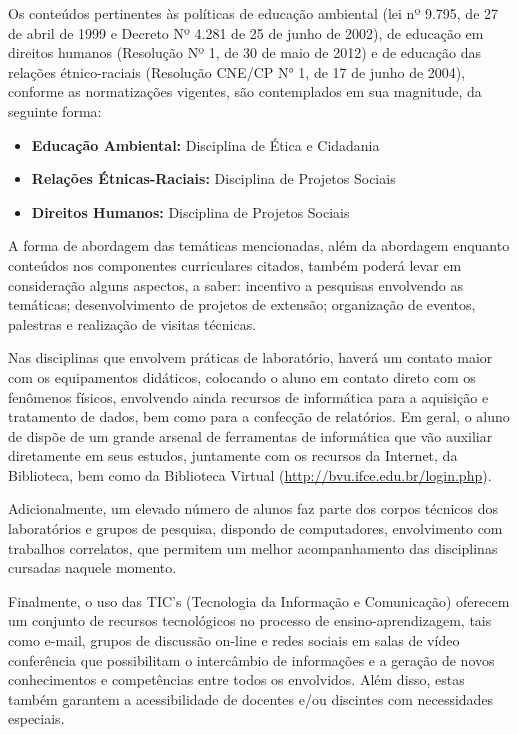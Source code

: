 Os conteúdos pertinentes às políticas de educação ambiental (lei nº 9.795, de 27 de abril de 1999 e Decreto Nº 4.281 de 25 de junho de 2002), de educação em direitos humanos (Resolução Nº 1, de 30 de maio de 2012) e de educação das relações étnico-raciais (Resolução CNE/CP N° 1, de 17 de junho de 2004), conforme as normatizações vigentes, são contemplados em sua magnitude, da seguinte forma:

\begin{itemize}
	\item \textbf{Educação Ambiental:} Disciplina de Ética e Cidadania 
	\item \textbf{Relações Étnicas-Raciais:} Disciplina de Projetos Sociais 
	\item \textbf{Direitos Humanos:} Disciplina de Projetos Sociais
\end{itemize}

A forma de abordagem das temáticas mencionadas, além da abordagem enquanto conteúdos nos componentes curriculares citados, também poderá levar em consideração alguns aspectos, a saber: incentivo a pesquisas envolvendo as temáticas; desenvolvimento de projetos de extensão; organização de eventos, palestras e realização de visitas técnicas.

Nas disciplinas que envolvem práticas de laboratório, haverá um contato maior com os equipamentos didáticos, colocando o aluno em contato direto com os fenômenos físicos, envolvendo ainda recursos de informática para a aquisição e tratamento de dados, bem como para a confecção de relatórios. Em geral, o aluno de \NOMEENG dispõe de um grande arsenal de ferramentas de informática que vão auxiliar diretamente em seus estudos, juntamente com os recursos da Internet, da Biblioteca, bem como da Biblioteca Virtual (\href{http://bvu.ifce.edu.br/login.php}{http://bvu.ifce.edu.br/login.php}). 

Adicionalmente, um elevado número de alunos faz parte dos corpos técnicos dos laboratórios e grupos de pesquisa, dispondo de computadores, envolvimento com trabalhos correlatos, que permitem um melhor acompanhamento das disciplinas cursadas naquele momento. 

Finalmente, o uso das TIC's (Tecnologia da Informação e Comunicação) oferecem um conjunto de recursos tecnológicos no processo de ensino-aprendizagem, tais como e-mail, grupos de discussão on-line e redes sociais em salas de vídeo conferência que possibilitam o intercâmbio de informações e a geração de novos conhecimentos e competências entre todos os envolvidos. Além disso, estas também garantem a acessibilidade de docentes e/ou discintes com necessidades especiais.


